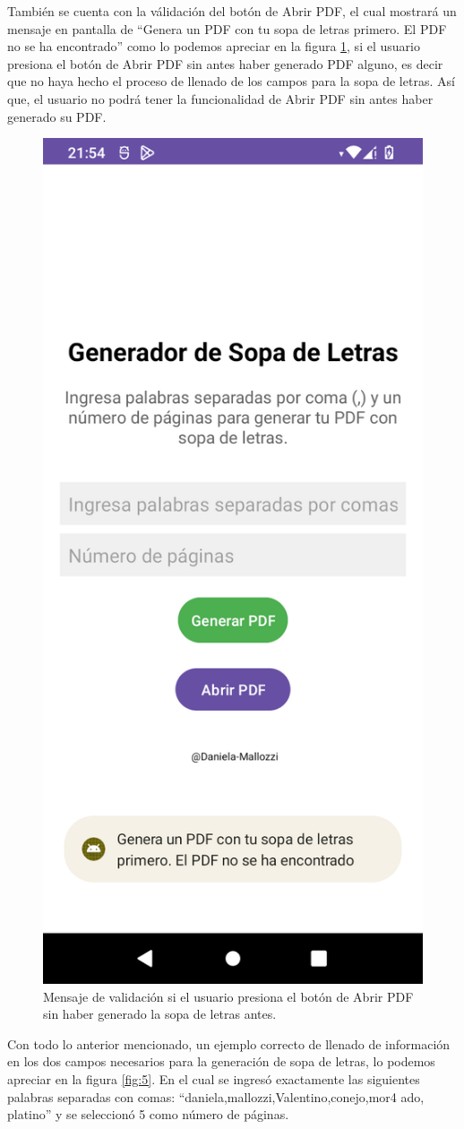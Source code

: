 \documentclass[conference]{IEEEtran}
\begin{document}
También se cuenta con la válidación del botón de Abrir PDF, el cual mostrará un mensaje en pantalla de \enquote{Genera un PDF con tu sopa de letras primero. El PDF no se ha encontrado} como lo podemos apreciar en la figura \ref{fig:4}, si el usuario presiona el botón de Abrir PDF sin antes haber generado PDF alguno, es decir que no haya hecho el proceso de llenado de los campos para la sopa de letras. Así que, el usuario no podrá tener la funcionalidad de Abrir PDF sin antes haber generado su PDF.
\begin{figure}[H]
    \centering
    \includegraphics[width=0.4\columnwidth]{imagenes/validacion_btn2.png}
    \caption{Mensaje de validación si el usuario presiona el botón de Abrir PDF sin haber generado la sopa de letras antes.}
    \label{fig:4}
\end{figure}



Con todo lo anterior mencionado, un ejemplo correcto de llenado de información en los dos campos necesarios para la generación de sopa de letras, lo podemos apreciar en la figura \ref{fig:5}. 
En el cual se ingresó exactamente las siguientes palabras separadas con comas:  \enquote{daniela,mallozzi,Valentino,conejo,mor4 ado, platino} y se seleccionó 5 como número de páginas.
\end{document}
